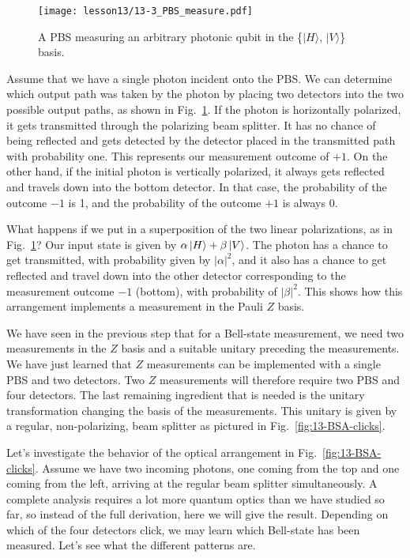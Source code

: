 \begin{figure}[t]
    \centering
    \texttt{[image: lesson13/13-3\_PBS\_measure.pdf]}
    \caption[A polarizing beam splitter (PBS) measuring a qubit.]{A PBS measuring an arbitrary photonic qubit in the \{$|H\rangle$, $|V\rangle$\} basis.}
    \label{fig:13-PBS-measure}
\end{figure}

Assume that we have a single photon incident onto the PBS.
We can determine which output path was taken by the photon by placing two detectors into the two possible output paths, as shown in Fig.~\ref{fig:13-PBS-measure}.
If the photon is horizontally polarized, it gets transmitted through the polarizing beam splitter.
It has no chance of being reflected and gets detected by the detector placed in the transmitted path with probability one.
This represents our measurement outcome of $+1$.
On the other hand, if the initial photon is vertically polarized, it always gets reflected and travels down into the bottom detector.
In that case, the probability of the outcome $-1$ is 1, and the probability of the outcome $+1$ is always 0.

What happens if we put in a superposition of the two linear polarizations, as in Fig.~\ref{fig:13-PBS-measure}?
Our input state is given by $\alpha\left| H \right\rangle + \beta \left| V \right\rangle$.
The photon has a chance to get transmitted, with probability given by $|\alpha|^2$, and it also has a chance to get reflected and travel down into the other detector corresponding to the measurement outcome $-1$ (bottom), with probability of $|\beta|^2$.
This shows how this arrangement implements a measurement in the Pauli $Z$ basis.

We have seen in the previous step that for a Bell-state measurement, we need two measurements in the $Z$ basis and a suitable unitary preceding the measurements.
We have just learned that $Z$ measurements can be implemented with a single PBS and two detectors.
Two $Z$ measurements will therefore require two PBS and four detectors.
The last remaining ingredient that is needed is the unitary transformation changing the basis of the measurements.
This unitary is given by a regular, non-polarizing, beam splitter as pictured in Fig.~\ref{fig:13-BSA-clicks}.

Let's investigate the behavior of the optical arrangement in Fig.~\ref{fig:13-BSA-clicks}.
Assume we have two incoming photons, one coming from the top and one coming from the left, arriving at the regular beam splitter simultaneously.
A complete analysis requires a lot more quantum optics than we have studied so far, so instead of the full derivation, here we will give the result.
Depending on which of the four detectors click, we may learn which Bell-state has been measured.
Let's see what the different patterns are.

